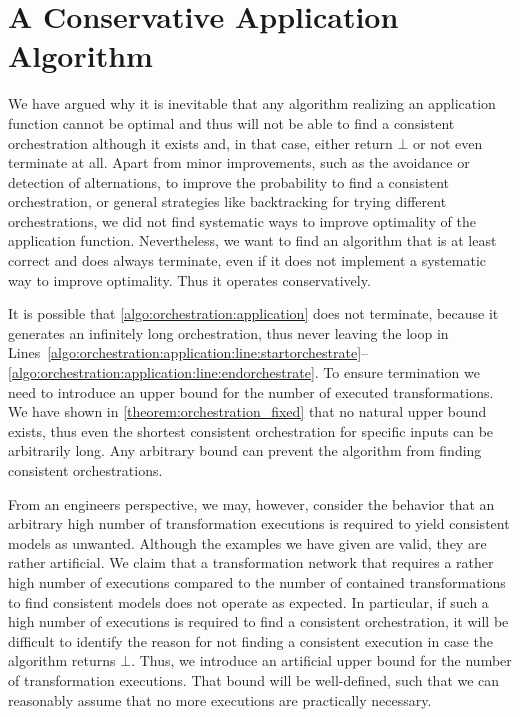 \section{A Conservative Application Algorithm}
\label{chap:orchestration:algorithm}

We have argued why it is inevitable that any algorithm realizing an application function cannot be optimal and thus will not be able to find a consistent orchestration although it exists and, in that case, either return $\bot$ or not even terminate at all.
Apart from minor improvements, such as the avoidance or detection of alternations, to improve the probability to find a consistent orchestration, or general strategies like backtracking for trying different orchestrations, we did not find systematic ways to improve optimality of the application function.
Nevertheless, we want to find an algorithm that is at least correct and does always terminate, even if it does not implement a systematic way to improve optimality.
Thus it operates conservatively.

It is possible that \autoref{algo:orchestration:application} does not terminate, because it generates an infinitely long orchestration, thus never leaving the loop in Lines~\ref{algo:orchestration:application:line:startorchestrate}--\ref{algo:orchestration:application:line:endorchestrate}.
To ensure termination we need to introduce an upper bound for the number of executed transformations.
We have shown in \autoref{theorem:orchestration_fixed} that no natural upper bound exists, thus even the shortest consistent orchestration for specific inputs can be arbitrarily long. %
Any arbitrary bound can prevent the algorithm from finding consistent orchestrations.

From an engineers perspective, we may, however, consider the behavior that an arbitrary high number of transformation executions is required to yield consistent models as unwanted.
Although the examples we have given are valid, they are rather artificial.
We claim that a transformation network that requires a rather high number of executions compared to the number of contained transformations to find consistent models does not operate as expected.
In particular, if such a high number of executions is required to find a consistent orchestration, it will be difficult to identify the reason for not finding a consistent execution in case the algorithm returns $\bot$.
Thus, we introduce an artificial upper bound for the number of transformation executions.
That bound will be well-defined, such that we can reasonably assume that no more executions are practically necessary.

